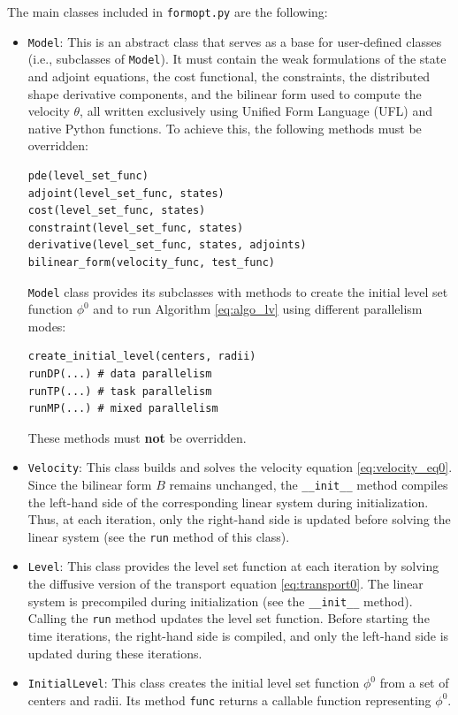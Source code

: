 \documentclass[iicol,pdflatex,sn-mathphys-ay]{sn-jnl}%
\theoremstyle{thmstyleone}%
\theoremstyle{thmstyletwo}%
\theoremstyle{thmstylethree}%
\begin{document}
The main classes included in \texttt{formopt.py} are the following:
\begin{itemize}
\item \texttt{Model}:
This is an abstract class that serves as a base for user-defined classes
(i.e., subclasses of \texttt{Model}).
It must contain
the weak formulations of the state and adjoint equations,
the cost functional, the constraints,
the distributed shape derivative components, and
the bilinear form used to compute the velocity $\theta$,
all written exclusively using Unified Form Language (UFL)
and native Python functions.
To achieve this, the following methods must be overridden:
\begin{lstlisting}
pde(level_set_func)
adjoint(level_set_func, states)
cost(level_set_func, states)
constraint(level_set_func, states)
derivative(level_set_func, states, adjoints)
bilinear_form(velocity_func, test_func)
\end{lstlisting}
\texttt{Model} class provides its subclasses with
methods to create the initial level set function $\phi^0$
and to run Algorithm \ref{eq:algo_lv} using
different parallelism modes:
\begin{lstlisting}
create_initial_level(centers, radii)
runDP(...) # data parallelism
runTP(...) # task parallelism
runMP(...) # mixed parallelism
\end{lstlisting}
These methods must \textbf{not} be overridden.

\item \texttt{Velocity}:
This class builds and solves the velocity equation \eqref{eq:velocity_eq0}. 
Since the bilinear form $B$ remains unchanged, the \texttt{\_\_init\_\_} method
compiles the left-hand side of the corresponding
linear system during initialization.
Thus, at each iteration, only the right-hand side is updated before solving
the linear system (see the \texttt{run} method of this class). 

\item \texttt{Level}:
This class provides the level set function at each iteration
by solving the diffusive version of
the transport equation \eqref{eq:transport0}. 
The linear system is precompiled during initialization
(see the \texttt{\_\_init\_\_} method). 
Calling the \texttt{run} method updates the level set function.
Before starting the time iterations, the right-hand side is compiled,
and only the left-hand side is updated during these iterations.

\item \texttt{InitialLevel}:
This class creates the initial level set function $\phi^0$
from a set of centers and radii.
Its method \texttt{func} returns a callable function representing $\phi^0$.


\end{itemize}
\end{document}
